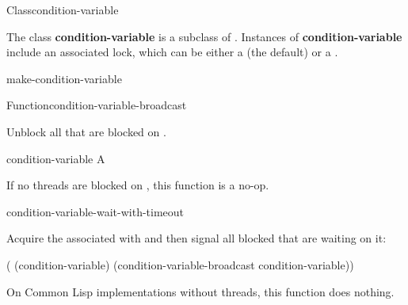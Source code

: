 \documentclass[10pt,twoside,english,pdftex]{article}
\begin{document}

\begin{functiondoc}{Class}{condition-variable}{}
%
  
\fnsyntax

\fnpackage {}

\fnmodule {}

\fndescription The class \textbf{condition-variable} is a subclass of
.  Instances of \textbf{condition-variable} include an
associated lock, which can be either a  (the default) or a
.

\begin{alsos}{make-condition-variable}
\end{alsos}

\end{functiondoc}


\begin{functiondoc}{Function}{condition-variable-broadcast}%
  {}
%

\fnsyntax

\fnpurpose Unblock all  that are blocked on .

\fnpackage {}

\fnmodule {}

\fnargs
\begin{args}{condition-variable}
 A 
\end{args}

\fnerrors
\nocvlock{}

\fndescription If no threads are blocked on , this
function is a no-op.

\begin{alsos}{condition-variable-wait-with-timeout}
\end{alsos}

%
\fnexample Acquire the  associated with 
and then signal all blocked  that are waiting on it:
\begin{example}
  ( (condition-variable)
    (condition-variable-broadcast condition-variable))
\end{example}

\fnnotes On Common Lisp implementations without threads, this function does
nothing.

\end{functiondoc}
\end{document}

